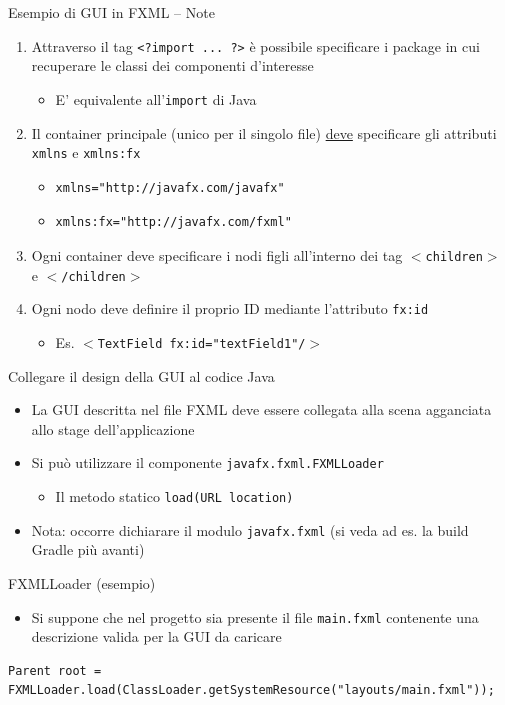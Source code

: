 \documentclass[xcolor=dvipsnames,presentation]{beamer}
\begin{document}
\begin{frame}[fragile]{Esempio di GUI in FXML -- Note}
\begin{enumerate}\itemsep15pt
\item Attraverso il tag \texttt{<?import ... ?>} è possibile specificare i package in cui recuperare le classi dei componenti d'interesse
\begin{itemize}
\item E' equivalente all'\texttt{import} di Java
\end{itemize}
\item Il container principale (unico per il singolo file) \underline{deve} specificare gli attributi \texttt{xmlns} e \texttt{xmlns:fx}
\begin{itemize}
\item \begin{verbatim}xmlns="http://javafx.com/javafx"\end{verbatim}
\item \begin{verbatim}xmlns:fx="http://javafx.com/fxml"\end{verbatim}
\end{itemize}
\item Ogni container deve specificare i nodi figli all'interno dei tag \texttt{$<$children$>$} e \texttt{$<$/children$>$}
\item Ogni nodo deve definire il proprio ID mediante l'attributo \texttt{fx:id}
\begin{itemize}
\item Es. \texttt{$<$TextField fx:id="textField1"/$>$}
\end{itemize}
\end{enumerate}
\end{frame}

\begin{frame}[fragile]{Collegare il design della GUI al codice Java}
\begin{itemize}\itemsep10pt
\item La GUI descritta nel file FXML deve essere collegata alla scena agganciata allo stage dell'applicazione
\item Si può utilizzare il componente \texttt{javafx.fxml.FXMLLoader}
\begin{itemize}
\item Il metodo statico \texttt{load(URL location)}
\end{itemize}
\item Nota: occorre dichiarare il modulo \texttt{javafx.fxml} (si veda ad es. la build Gradle più avanti)
\end{itemize}
\begin{block}{FXMLLoader (esempio)}
\begin{itemize}
\item Si suppone che nel progetto sia presente il file \texttt{main.fxml} contenente una descrizione valida per la GUI da caricare
\end{itemize}
\begin{lstlisting}
Parent root = FXMLLoader.load(ClassLoader.getSystemResource("layouts/main.fxml"));
\end{lstlisting}
\end{block}
\end{frame}
\end{document}
